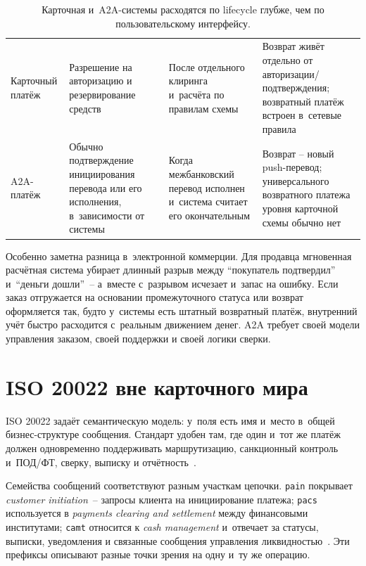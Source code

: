 \begin{table}[H]
  \begingroup
  \small
  \setlength{\tabcolsep}{4pt}
  \renewcommand{\arraystretch}{1.2}
  \begin{tabularx}{\textwidth}{
      @{}B{0.18\textwidth}
      Y
      Y
      Y@{}
    }
    \toprule
    \headrow
     &  &
     &
     \\
    \midrule
    Карточный платёж &
    Разрешение на авторизацию и резервирование средств &
    После отдельного клиринга и~расчёта по правилам схемы &
    Возврат живёт отдельно от авторизации/подтверждения; возвратный платёж встроен
    в~сетевые правила \\
    A2A-платёж &
    Обычно подтверждение инициирования перевода или его исполнения,
    в~зависимости от системы &
    Когда межбанковский перевод исполнен и~система считает его окончательным &
    Возврат -- новый push-перевод; универсального возвратного платежа
    уровня карточной схемы обычно нет \\
    \bottomrule
  \end{tabularx}%
  \endgroup
  \caption{Карточная и~A2A-системы расходятся по lifecycle глубже,
  чем по пользовательскому интерфейсу.}\label{tab:card-vs-a2a}
\end{table}

Особенно заметна разница в~электронной коммерции. Для продавца
мгновенная расчётная система убирает длинный разрыв между
\enquote{покупатель подтвердил} и~\enquote{деньги дошли}~--
а~вместе с~разрывом исчезает и~запас на ошибку. Если заказ отгружается
на основании промежуточного статуса или возврат оформляется так, будто
у~системы есть штатный возвратный платёж, внутренний учёт быстро
расходится с~реальным движением денег. A2A требует своей модели
управления заказом, своей поддержки и своей логики сверки.

\section{ISO 20022 вне карточного мира}\label{sec:iso20022}

ISO 20022 задаёт семантическую модель: у~поля есть имя и~место
в~общей бизнес-структуре сообщения. Стандарт удобен там, где один
и~тот же платёж должен одновременно поддерживать маршрутизацию,
санкционный контроль и~ПОД/ФТ, сверку, выписку
и отчётность~\cite{iso-20022}.

Семейства сообщений соответствуют разным участкам цепочки.
\texttt{pain} покрывает \textit{customer initiation}~-- запросы
клиента на инициирование платежа; \texttt{pacs} используется
в \textit{payments clearing and settlement} между финансовыми
институтами; \texttt{camt} относится к \textit{cash management}
и~отвечает за статусы, выписки, уведомления и связанные сообщения
управления ликвидностью~\cite{iso-20022-business-areas}. Эти префиксы
описывают разные точки зрения на одну и~ту же операцию.

